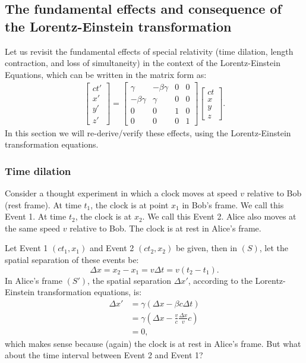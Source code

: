 \documentclass[a4paper,11pt]{article}
\numberwithin{equation}{section}
\begin{document}
 \subsection{The fundamental effects and consequence of the Lorentz-Einstein transformation}
 Let us revisit the fundamental effects of special relativity (time dilation, length contraction, and loss of simultaneity) in the context of the Lorentz-Einstein Equations, which can be written in the matrix form as:
 \begin{gather*}
 \begin{bmatrix} ct' \\ x' \\ y' \\ z' \end{bmatrix}
 =
 \begin{bmatrix}
 \gamma & -\beta\gamma & 0 & 0\\
 -\beta\gamma & \gamma & 0 & 0\\
 0 & 0 & 1 & 0\\
 0 & 0 & 0 & 1
 \end{bmatrix}
 \begin{bmatrix}
 ct \\x \\ y \\ z
 \end{bmatrix}.
 \end{gather*}
 In this section we will re-derive/verify these effects, using the Lorentz-Einstein transformation equations.  
  
 \subsubsection{Time dilation}
 Consider a thought experiment in which a clock moves at speed $v$ relative to Bob (rest frame). At time $t_1$, the clock is at point $x_1$ in Bob's frame. We call this Event 1. At time $t_2$, the clock is at $x_2$. We call this Event 2. Alice also moves at the same speed $v$ relative to Bob. The clock is at rest in Alice's frame.
 
 \noindent Let Event 1 $(ct_1,x_1)$ and Event 2 $(ct_2, x_2)$ be given, then in $(S)$, let the spatial separation of these events be:
 \begin{equation}
 \Delta x = x_2-x_1=v\Delta t=v(t_2-t_1).
 \end{equation}
 In Alice's frame $(S')$, the spatial separation $\Delta x'$, according to the Lorentz-Einstein transformation equations, is:
 \begin{equation}
 \begin{split}
 \Delta x' &= \gamma(\Delta x-\beta c\Delta t)\\
 &= \gamma\left(\Delta x - \frac{v}{c}\frac{\Delta x}{v}c \right)\\
 &= 0, 
 \end{split}
 \end{equation}
 which makes sense because (again) the clock is at rest in Alice's frame. But what about the time interval between Event 2 and Event 1?
 
\end{document}
